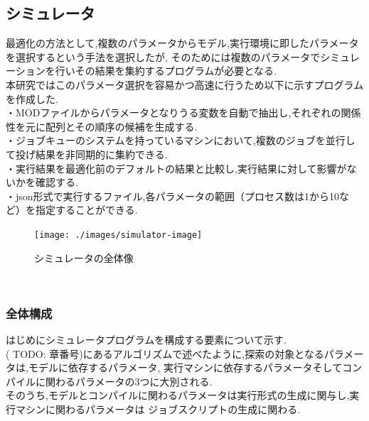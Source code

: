 \subsection{シミュレータ}
最適化の方法として,複数のパラメータからモデル,実行環境に即したパラメータを選択するという手法を選択したが,
そのためには複数のパラメータでシミュレーションを行いその結果を集約するプログラムが必要となる.\\
本研究ではこのパラメータ選択を容易かつ高速に行うため以下に示すプログラムを作成した.\\
・MODファイルからパラメータとなりうる変数を自動で抽出し,それぞれの関係性を元に配列とその順序の候補を生成する.\\
・ジョブキューのシステムを持っているマシンにおいて,複数のジョブを並行して投げ結果を非同期的に集約できる.\\
・実行結果を最適化前のデフォルトの結果と比較し,実行結果に対して影響がないかを確認する.\\
・json形式で実行するファイル,各パラメータの範囲（プロセス数は1から10など）を指定することができる.\\

\begin{figure}[htb]
  \begin{center}
    \texttt{[image: ./images/simulator-image]}
    \caption{シミュレータの全体像}
    \label{fig:simulator-image}
  \end{center}
\end{figure}~\\

\subsubsection{全体構成}
はじめにシミュレータプログラムを構成する要素について示す.\\
( TODO: 章番号)にあるアルゴリズムで述べたように,探索の対象となるパラメータは,モデルに依存するパラメータ,
実行マシンに依存するパラメータそしてコンパイルに関わるパラメータの3つに大別される.\\
そのうち,モデルとコンパイルに関わるパラメータは実行形式の生成に関与し,実行マシンに関わるパラメータは
ジョブスクリプトの生成に関わる.\\
